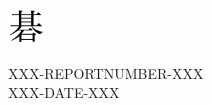 \documentclass[11pt]{article}
\begin{document}
\vbox{}
\vskip60mm
\begin{sideways}
\begin{minipage}[t]{10mm}
\includegraphics[width=10mm]{go.png}
\end{minipage}
\begin{minipage}[t]{100mm}
\vbox{}\vskip-10mm
XXX-REPORTNUMBER-XXX\\
\small
XXX-DATE-XXX
\end{minipage}
\end{sideways}
\vfill
\end{document}
